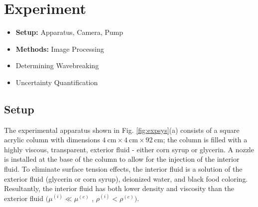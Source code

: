 \documentclass{jfm}
\begin{document}
\begin{figure}
  \caption{}
  \label{fig:chars2}
\end{figure}

\section{Experiment}\label{sec:Exp}
	\begin{itemize}
	    \item \textbf{Setup:} Apparatus, Camera, Pump
	    \item \textbf{Methods: }Image Processing
	    \item Determining Wavebreaking
	    \item Uncertainty Quantification 
	\end{itemize}
	\subsection{Setup}
	
The experimental apparatus shown in Fig. \ref{fig:expsys}(a) consists of a square acrylic column with dimensions  $\SI{4}{\centi\meter} \times \SI{4}{\centi\meter} \times \SI{92}{\centi\meter}$; the column is filled with a highly viscous, transparent, exterior fluid - either corn syrup or glycerin. 
A nozzle is installed at the base of the column to allow for the injection of the interior fluid. To eliminate surface tension effects, the interior fluid is a solution of the exterior fluid (glycerin or corn syrup), deionized water, and black food coloring. 
Resultantly, the interior fluid has both lower density and viscosity than the exterior fluid $(\mu^{(i)} \ll \mu^{(e)}$ , $\rho^{(i)} < \rho^{(e)})$.
\end{document}
